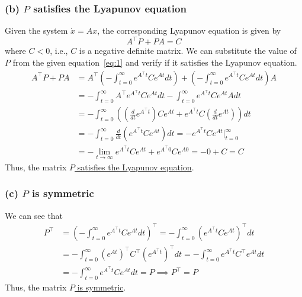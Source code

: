 \subsubsection*{(b) \( P \) satisfies the Lyapunov equation}

Given the system \( \dot x = A x \), the corresponding Lyapunov equation is given by
\begin{equation*}
    A^{\top} P + P A = C
\end{equation*}
where \( C < 0 \), i.e., \( C \) is a negative definite matrix.
We can substitute the value of \( P \) from the given equation~\eqref{eq:1} and verify if it satisfies the Lyapunov equation.
\begin{align*}
    A^\top P + P A
     & =
    A^\top \left( -\int_{t=0}^{\infty} e^{A^{\top} t} C e^{A t} d t \right) + \left( -\int_{t=0}^{\infty} e^{A^{\top} t} C e^{A t} d t \right) A
    \\ & =
    -\int_{t=0}^{\infty} A^\top e^{A^{\top} t} C e^{A t} d t - \int_{t=0}^{\infty} e^{A^{\top} t} C e^{A t} A d t
    \\ & =
    -\int_{t=0}^{\infty} \left( \left( \frac{d}{dt} e^{A^{\top} t} \right) C e^{A t} + e^{A^{\top} t} C \left( \frac{d}{dt} e^{A t} \right) \right) d t
    \\ & =
    -\int_{t=0}^{\infty} \frac{d}{dt} \left( e^{A^{\top} t} C e^{A t} \right) d t
    =
    - e^{A^{\top} t} C e^{A t} \Big|_{t=0}^{\infty}
    \\ & =
    - \lim_{t \to \infty} e^{A^{\top} t} C e^{A t} + e^{A^{\top} 0} C e^{A 0}
    =
    - 0 + C
    =
    C
\end{align*}
Thus, the matrix \underline{\( P \) satisfies the Lyapunov equation}.

\subsubsection*{(c) \( P \) is symmetric}

We can see that
\begin{align*}
    P^\top
     & =
    {\left( -\int_{t=0}^{\infty} e^{A^{\top} t} C e^{A t} d t \right)}^\top
    =
    -\int_{t=0}^{\infty} {\left( e^{A^{\top} t} C e^{A t} \right)}^\top d t
    \\ & =
    -\int_{t=0}^{\infty} {\left( e^{A t} \right)}^\top C^\top {\left( e^{A^{\top} t} \right)}^\top d t
    =
    -\int_{t=0}^{\infty} e^{A^\top t} C^\top e^{A t} d t
    \\ & =
    - \int_{t=0}^{\infty} e^{A^\top t} C e^{A t} d t
    =
    P
    \implies
    \boxed{
        P^\top = P
    }
\end{align*}
Thus, the matrix \underline{\( P \) is symmetric}.
